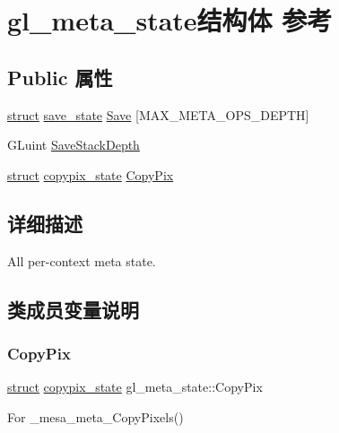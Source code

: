 \hypertarget{structgl__meta__state}{}\section{gl\+\_\+meta\+\_\+state结构体 参考}
\label{structgl__meta__state}
\subsection*{Public 属性}
\begin{DoxyCompactItemize}
\item 
\hyperlink{interfacestruct}{struct} \hyperlink{structsave__state}{save\+\_\+state} \hyperlink{structgl__meta__state_a3a2dbfa9a2df09415239757822bc62ab}{Save} \mbox{[}M\+A\+X\+\_\+\+M\+E\+T\+A\+\_\+\+O\+P\+S\+\_\+\+D\+E\+P\+TH\mbox{]}
\item 
G\+Luint \hyperlink{structgl__meta__state_a8b77c311b5a78255d6b7611ba5072016}{Save\+Stack\+Depth}
\item 
\hyperlink{interfacestruct}{struct} \hyperlink{structcopypix__state}{copypix\+\_\+state} \hyperlink{structgl__meta__state_a7574fff67b9065bf144154d33e6e4cef}{Copy\+Pix}
\end{DoxyCompactItemize}


\subsection{详细描述}
All per-\/context meta state. 

\subsection{类成员变量说明}
\mbox{\label{structgl__meta__state_a7574fff67b9065bf144154d33e6e4cef}} 
\subsubsection{\texorpdfstring{Copy\+Pix}{CopyPix}}
{\footnotesize\ttfamily \hyperlink{interfacestruct}{struct} \hyperlink{structcopypix__state}{copypix\+\_\+state} gl\+\_\+meta\+\_\+state\+::\+Copy\+Pix}

For \+\_\+mesa\+\_\+meta\+\_\+\+Copy\+Pixels() \mbox{\label{structgl__meta__state_a3a2dbfa9a2df09415239757822bc62ab}} 

